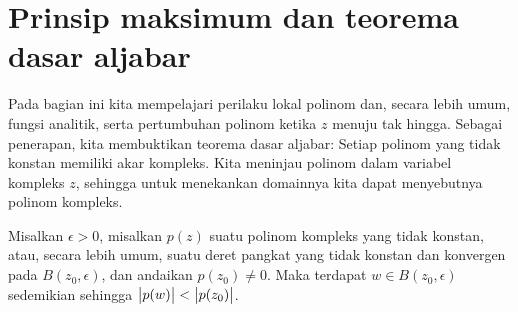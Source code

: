
\sectionnewpage
\section[Prinsip maksimum dan teorema dasar aljabar]{Prinsip maksimum dan teorema dasar aljabar}
\label{sec:fundalgeb}


Pada bagian ini kita mempelajari perilaku lokal polinom dan,
secara lebih umum, fungsi analitik,
serta pertumbuhan polinom ketika $z$ menuju tak hingga.
Sebagai penerapan, kita membuktikan teorema dasar aljabar:
Setiap polinom yang tidak konstan memiliki akar kompleks.
Kita meninjau polinom dalam variabel kompleks $z$,
sehingga untuk menekankan domainnya kita dapat menyebutnya polinom kompleks.

\begin{lemma} \label{lemma:polyalwaysgetssmaller}
Misalkan $\epsilon > 0$,
misalkan $p(z)$ suatu polinom kompleks yang tidak konstan, atau, secara lebih umum,
suatu deret pangkat yang tidak konstan dan konvergen pada $B(z_0,\epsilon)$,
dan andaikan $p(z_0) \neq 0$.
Maka terdapat $w \in B(z_0,\epsilon)$ sedemikian sehingga $\bigl\lvert {p(w)} \bigr\rvert < \bigl\lvert {p(z_0)} \bigr\rvert$.
\end{lemma}

